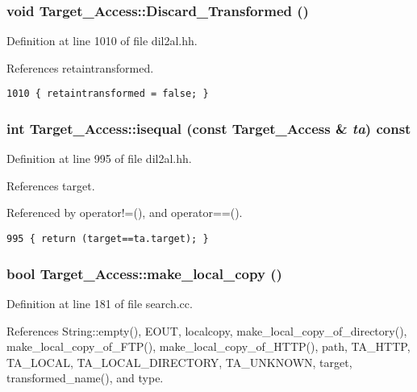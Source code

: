 \subsubsection{\setlength{\rightskip}{0pt plus 5cm}void Target\_\-Access::Discard\_\-Transformed ()\hspace{0.3cm}{\tt  [inline]}}\label{classTarget__Access_a18}




Definition at line 1010 of file dil2al.hh.

References retaintransformed.



\footnotesize\begin{verbatim}1010 { retaintransformed = false; }
\end{verbatim}\normalsize 
{}
\subsubsection{\setlength{\rightskip}{0pt plus 5cm}int Target\_\-Access::isequal (const Target\_\-Access \& {\em ta}) const\hspace{0.3cm}{\tt  [inline]}}\label{classTarget__Access_a3}




Definition at line 995 of file dil2al.hh.

References target.

Referenced by operator!=(), and operator==().



\footnotesize\begin{verbatim}995 { return (target==ta.target); }
\end{verbatim}\normalsize 
{}
\subsubsection{\setlength{\rightskip}{0pt plus 5cm}bool Target\_\-Access::make\_\-local\_\-copy ()}\label{classTarget__Access_a6}




Definition at line 181 of file search.cc.

References String::empty(), EOUT, localcopy, make\_\-local\_\-copy\_\-of\_\-directory(), make\_\-local\_\-copy\_\-of\_\-FTP(), make\_\-local\_\-copy\_\-of\_\-HTTP(), path, TA\_\-HTTP, TA\_\-LOCAL, TA\_\-LOCAL\_\-DIRECTORY, TA\_\-UNKNOWN, target, transformed\_\-name(), and type.

